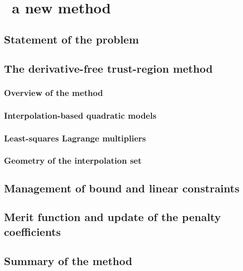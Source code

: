 %
%
%
\chapter{ \textemdash\ a new  method}
\label{ch:cobyqa-introduction}

\section{Statement of the problem}

\section{The derivative-free trust-region  method}

\subsection{Overview of the method}

\subsection{Interpolation-based quadratic models}

\subsection{Least-squares Lagrange multipliers}

\subsection{Geometry of the interpolation set}

\section{Management of bound and linear constraints}

\section{Merit function and update of the penalty coefficients}

\section{Summary of the method}
